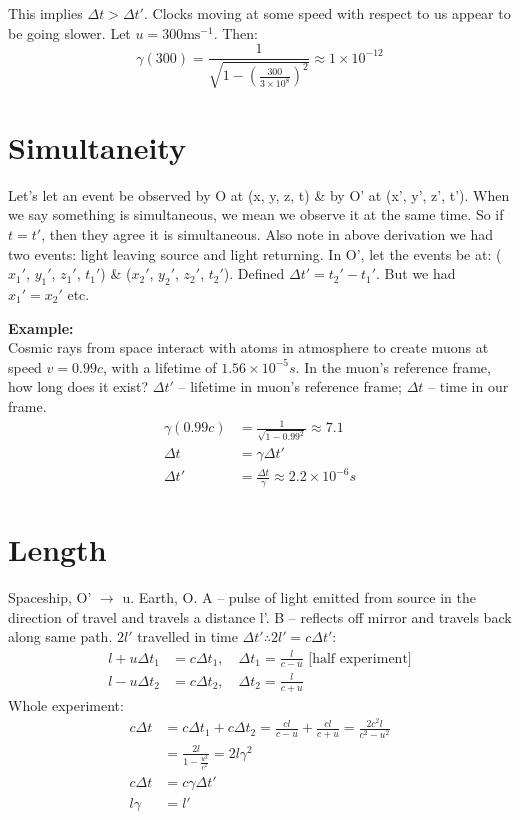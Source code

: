 \documentclass[a4paper, 11pt, normalem]{report}
\begin{document}
This implies $\Delta t > \Delta t'$.
Clocks moving at some speed with respect to us appear to be going slower.
Let $u = 300\text{ms}^{-1}$. 
Then:
\begin{equation}
    \gamma(300) = \frac{1}{\sqrt{1 - (\tfrac{300}{3\times10^{8}})^{2}}} \approx 1\times10^{-12}
\end{equation}

\section{Simultaneity}
Let's let an event be observed by O at (x, y, z, t) \& by O' at (x', y', z', t').
When we say something is simultaneous, we mean we observe it at the same time.
So if $t = t'$, then they agree it is simultaneous.
Also note in above derivation we had two events: light leaving source and light returning.
In O', let the events be at: 
($x_{1}'$, $y_{1}'$, $z_{1}'$, $t_{1}'$) \& ($x_{2}'$, $y_{2}'$, $z_{2}'$, $t_{2}'$).
Defined $\Delta t' = t_{2}' - t_{1}'$.
But we had $x_{1}' = x_{2}'$ etc.

\textbf{Example:}\\
Cosmic rays from space interact with atoms in atmosphere to create muons at speed $v = 0.99c$, with a lifetime of $1.56\times10^{-5}s$.
In the muon's reference frame, how long does it exist? 
$\Delta t'$ -- lifetime in muon's reference frame;
$\Delta t$ -- time in our frame.
\begin{align}
    \gamma(0.99c) &= \frac{1}{\sqrt{1 - 0.99^{2}}} \approx 7.1 \\
    \Delta t &= \gamma\Delta t' \\
    \Delta t' &= \frac{\Delta t}{\gamma} \approx 2.2\times10^{-6}s
\end{align}

\section{Length}
Spaceship, O' $\rightarrow$ u.
Earth, O.
A -- pulse of light emitted from source in the direction of travel and travels a distance l'. 
B -- reflects off mirror and travels back along same path.
$2l'$ travelled in time $\Delta t' \therefore 2l' = c\Delta t'$:
\begin{align}
    l + u\Delta t_{1} &= c\Delta t_{1},\quad \Delta t_{1} = \frac{l}{c - u} \text{ [half experiment]} \\
    l - u\Delta t_{2} &= c\Delta t_{2},\quad \Delta t_{2} = \frac{l}{c + u}
\end{align}
Whole experiment:
\begin{align}
    c\Delta t &= c\Delta t_{1} + c\Delta t_{2} = \frac{cl}{c - u} + \frac{cl}{c + u} = \frac{2c^{2}l}{c^{2} - u^{2}} \\
              &= \frac{2l}{1 - \tfrac{u^{2}}{c^{2}}} = 2l\gamma^{2} \\
    c\Delta t &= c\gamma\Delta t' \\
    l\gamma &= l'
\end{align}
\end{document}
